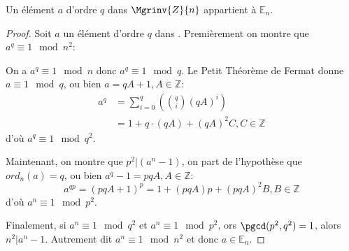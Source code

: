 		\begin{theorem}{Un élément $a$ d'ordre $q$ dans $\Mgrinv{Z}{n}$ appartient à $\mathbb{E}_n$. }
		\label{aneq1:sufisante}
		\begin{proof}Soit $a$ un élément d'ordre $q$ dans .
			Premièrement on montre que $a^q \equiv 1 \mod{n^2}$:

			On a $a^q \equiv 1 \mod{n}$ donc $a^q \equiv 1 \mod{q}$. Le Petit Théorème de Fermat donne $a \equiv 1 \mod{q}$, 
			ou bien $a = qA+1, A\in \mathbb{Z}$:
			\begin{align}
				a^q &= \sum_{i=0}^{q}\left( {q \choose i} (qA)^i \right) \nonumber\\
				&= 1+q\cdot(qA) + (qA)^2C, C\in\mathbb{Z}\nonumber
			\end{align}
			d'où	$a^q\equiv 1 \mod{q^2}$.
			
			Maintenant, on montre que $p^2|(a^n -1)$, on part de l'hypothèse que $ord_{n}(a) = q$, 
			ou bien $a^q-1 = pqA, A\in \mathbb{Z}$:
			$$ 	a^{qp} =(pqA+1)^p =1+(pqA)p+(pqA)^2B, B \in \mathbb{Z} $$
			d'où $a^n \equiv 1\mod{p^2}$.

			Finalement, si $a^n\equiv 1 \mod{q^2}$ et $a^n \equiv 1\mod{p^2}$, ors $\pgcd(p^2,q^2) = 1$, alors $n^2 | a^n-1$. Autrement dit
			$a^n \equiv 1 \mod{n^2}$ et donc  $a \in \mathbb{E}_n$.
%			
%
		\end{proof}
		\end{theorem}

